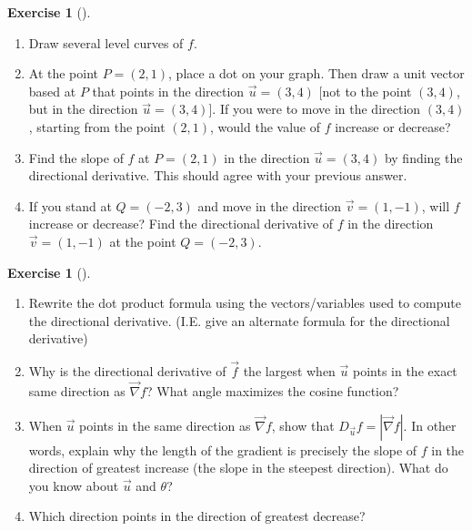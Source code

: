 \documentclass[10pt,]{book}
\theoremstyle{plain}
\theoremstyle{definition}
\theoremstyle{definition}
\theoremstyle{definition}
\theoremstyle{definition}
\newtheorem{exploration}[project]{Exercise}
\theoremstyle{definition}
\numberwithin{equation}{section}
\begin{document}
\begin{exploration}[]\label{exploration-227}
\leavevmode%
\begin{enumerate}[font=\bfseries,label=(\alph*),ref=\alph*]
\item\label{task-605} Draw several level curves of \(f\).%
\item\label{task-606} At the point \(P=(2,1)\), place a dot on your graph. Then draw a unit vector based at \(P\) that points in the direction \(\vec u=(3,4)\) [not to the point \((3,4)\), but in the direction \(\vec u=(3,4)\)]. If you were to move in the direction \((3,4)\), starting from the point \((2,1)\), would the value of \(f\) increase or decrease?%
\item\label{task-607} Find the slope of \(f\) at \(P=(2,1)\) in the direction \(\vec u=(3,4)\) by finding the directional derivative. This should agree with your previous answer.%
\item\label{task-608} If you stand at \(Q=(-2,3)\) and move in the direction \(\vec v= (1,-1)\), will \(f\) increase or decrease?  Find the directional derivative of \(f\) in the direction \(\vec v=(1,-1)\) at the point \(Q=(-2,3)\).%
\end{enumerate}
\end{exploration}
\begin{exploration}[]\label{exploration-228}
\leavevmode%
\begin{enumerate}[font=\bfseries,label=(\alph*),ref=\alph*]
\item\label{task-609} Rewrite the dot product formula using the vectors/variables used to compute the directional derivative. (I.E. give an alternate formula for the directional derivative)%
\item\label{task-610} Why is the directional derivative of \(\vec f\) the largest when \(\vec u\) points in the exact same direction as \(\vec \nabla f\)? What angle maximizes the cosine function?%
%
\item\label{task-611} When \(\vec u\) points in the same direction as \(\vec \nabla f\), show that \(D_{\vec u}f = |\vec \nabla f|\). In other words, explain why the length of the gradient is precisely the slope of \(f\) in the direction of greatest increase (the slope in the steepest direction). What do you know about \(\vec{u}\) and \(\theta\)?%
%
\item\label{task-612} Which direction points in the direction of greatest decrease?%
\end{enumerate}
\end{exploration}
\end{document}
